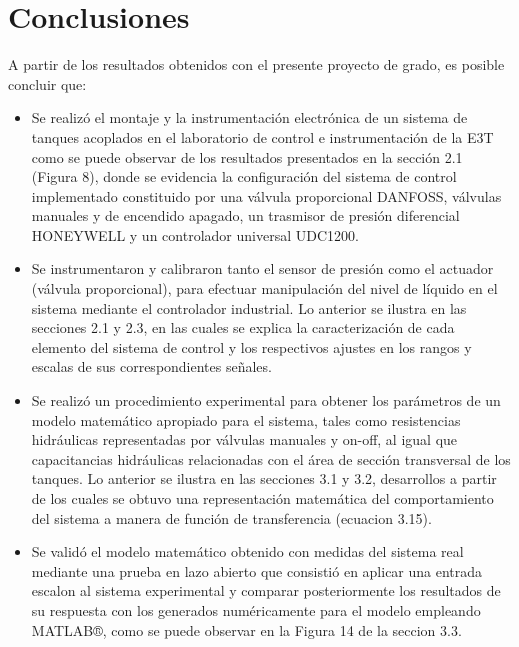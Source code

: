 \documentclass[a4paper,12pt,twoside]{proyectotanquesecci}
\begin{document}






\chapter{Conclusiones}

A partir de los resultados obtenidos con el presente proyecto de grado, es posible concluir que: \\

\begin{itemize}
\item Se realizó el montaje y la instrumentación electrónica de un sistema de tanques acoplados en el laboratorio de control e instrumentación de la E3T como se puede observar de los resultados presentados en la sección 2.1 (Figura 8), donde se evidencia la configuración del sistema de control implementado constituido por una válvula proporcional DANFOSS, válvulas manuales y de encendido apagado, un trasmisor de presión diferencial HONEYWELL y un controlador universal UDC1200.
\item Se instrumentaron y calibraron tanto el sensor de presión como el actuador (válvula proporcional), para efectuar manipulación del nivel de líquido en el sistema mediante el controlador industrial. Lo anterior se ilustra en las secciones 2.1 y 2.3, en las cuales se explica la caracterización de cada elemento del sistema de control y los respectivos ajustes en los rangos y escalas de sus correspondientes señales.
\item Se realizó un procedimiento experimental para obtener los parámetros de un modelo matemático apropiado para el sistema, tales como resistencias hidráulicas representadas por válvulas manuales y on-off, al igual que capacitancias hidráulicas relacionadas con el área de sección transversal de los tanques. Lo anterior se ilustra en las secciones 3.1 y 3.2, desarrollos a partir de los cuales se obtuvo una representación matemática del comportamiento del sistema a manera de función de transferencia (ecuacion 3.15).
\item Se validó el modelo matemático obtenido con medidas del sistema real mediante una prueba en lazo abierto que consistió en aplicar una entrada escalon al sistema experimental y comparar posteriormente los resultados de su respuesta con los generados numéricamente para el modelo empleando MATLAB®, como se puede observar en la Figura 14 de la seccion 3.3.

\end{itemize}
\end{document}
